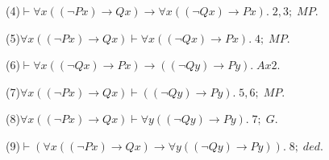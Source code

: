 (4)$\vdash \forall x((\neg Px) \rightarrow Qx) \rightarrow \forall x((\neg Qx) \rightarrow Px). \; 2, 3; \;MP.$

(5)$ \forall x((\neg Px) \rightarrow Qx) \vdash \forall x((\neg Qx) \rightarrow Px). \; 4; \; MP.$

(6)$\vdash \forall x((\neg Qx) \rightarrow Px) \rightarrow ((\neg Qy) \rightarrow Py). \; Ax2.$

(7)$\forall x((\neg Px) \rightarrow Qx) \vdash ((\neg Qy) \rightarrow Py). \; 5, 6; \; MP.$

(8)$\forall x((\neg Px) \rightarrow Qx) \vdash \forall y((\neg Qy) \rightarrow Py). \; 7; \; G.$

(9)$\vdash (\forall x((\neg Px) \rightarrow Qx) \rightarrow \forall y((\neg Qy) \rightarrow Py)). \; 8; \; ded.$